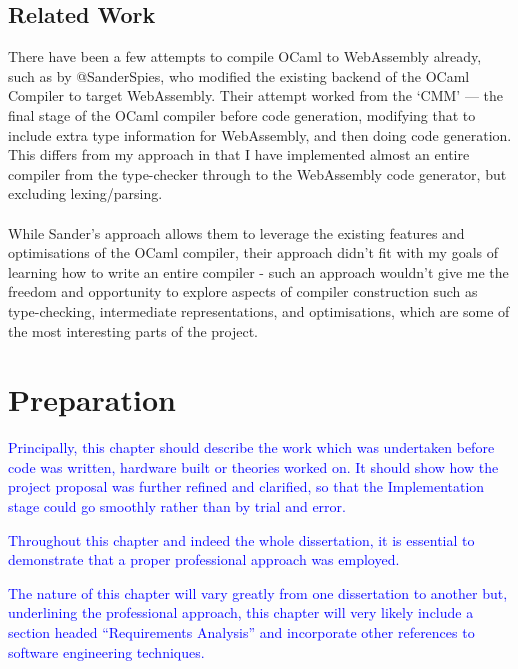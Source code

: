 \documentclass[12pt,twoside,notitlepage]{report}
\newcommand\note[1]{\textcolor{blue}{#1}}
\begin{document}



\section{Related Work}

There have been a few attempts to compile OCaml to WebAssembly already, such as by @SanderSpies\cite{Awbfo}, who modified the existing backend of the OCaml Compiler to target WebAssembly. Their attempt worked from the `CMM' --- the final stage of the OCaml compiler before code generation, modifying that to include extra type information for WebAssembly, and then doing code generation. This differs from my approach in that I have implemented almost an entire compiler from the type-checker through to the WebAssembly code generator, but excluding lexing/parsing.
\\\\
While Sander's approach allows them to leverage the existing features and optimisations of the OCaml compiler, their approach didn't fit with my goals of learning how to write an entire compiler - such an approach wouldn't give me the freedom and opportunity to explore aspects of compiler construction such as type-checking, intermediate representations, and optimisations, which are some of the most interesting parts of the project.


\clearpage



\chapter{Preparation}
\note{Principally, this chapter should describe the work which was undertaken before code was written, hardware built or theories worked on. It should show how the project proposal was further refined and clarified, so that the Implementation stage could go smoothly rather than by trial and error.}

\note{Throughout this chapter and indeed the whole dissertation, it is essential to demonstrate that a proper professional approach was employed.}

\note{The nature of this chapter will vary greatly from one dissertation to another but, underlining the professional approach, this chapter will very likely include a section headed “Requirements Analysis” and incorporate other references to software engineering techniques.}
\end{document}
